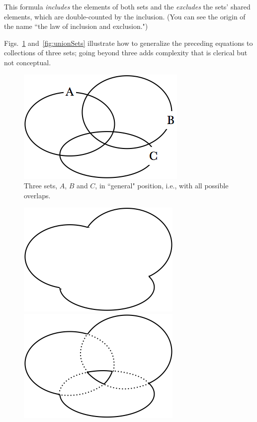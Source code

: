\begin{itemize}
\begin{itemize}
This formula {\em includes} the elements of both sets and the {\em excludes} the sets' shared elements, which are double-counted by the inclusion.  (You can see the origin of the name ``the law of inclusion and exclusion.")
 \end{itemize}
Figs.~\ref{fig:unionSetsInit} and~\ref{fig:unionSets} illustrate how to generalize the preceding equations to collections of three sets; going beyond three adds complexity that is clerical but not conceptual.
\begin{figure}[htb]
\begin{center}
        \includegraphics[scale=0.35]{FiguresMaths/3sets}
    \caption{Three sets, $A$, $B$ and $C$, in ``general" position, i.e., with all possible overlaps.}
        \label{fig:unionSetsInit}
\end{center}
\end{figure}
\begin{figure}[htb]
\begin{center}
        \includegraphics[scale=0.35]{FiguresMaths/RuleAdditive}
        \hspace{1cm}
        \includegraphics[scale=0.35]{FiguresMaths/RuleAdditive2}

\end{center}
\end{figure}
\end{itemize}

